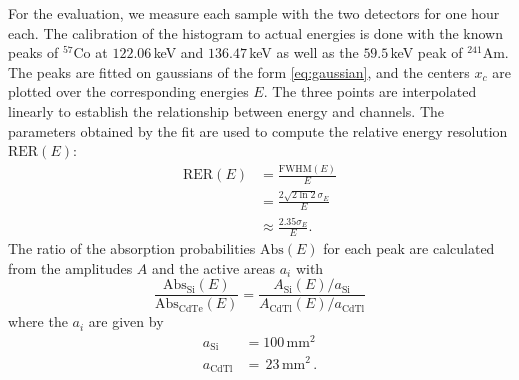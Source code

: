 For the evaluation, we measure each sample with the two detectors for 
one hour each. The calibration of the histogram to actual energies is 
done with the known peaks of $^{57}$Co at $122.06\,$keV and $136.47\,$keV 
as well as the $59.5\,$keV peak of $^{241}$Am. The peaks are fitted on 
gaussians of the form \eqref{eq:gaussian}, and the centers $x_c$ are 
plotted over the corresponding energies $E$. The three points 
are interpolated linearly to establish the relationship between energy and channels.  
The parameters obtained by the fit are used to compute 
the relative energy resolution $\mathrm{RER}(E)$:
\begin{equation}
    \begin{split}
        \mathrm{RER}(E) &= \frac{\mathrm{FWHM}(E)}{E} \\
                        &= \frac{2 \sqrt{2 \ln 2} \sigma_E}{E} \\
                        &\approx \frac{2.35 \sigma_E}{E} .
    \end{split}    
    \label{eq:RER}
\end{equation}
The ratio of the absorption probabilities $\mathrm{Abs}(E)$ for each peak 
are calculated from the amplitudes $A$ and the active areas $a_i$ with 
\begin{equation}
    \frac{\mathrm{Abs_{Si}}(E)}{\mathrm{Abs_{CdTe}}(E)}
        = \frac{A_\mathrm{Si}(E) / a_\mathrm{Si}}{A_\mathrm{CdTl}(E) / a_\mathrm{CdTl}}
\end{equation}
where the $a_i$ are given by
\begin{align}
    a_\mathrm{Si}   &= 100 \, \mathrm{mm^2} \\
    a_\mathrm{CdTl} &= \,23 \, \mathrm{mm^2} \, .
\end{align}
